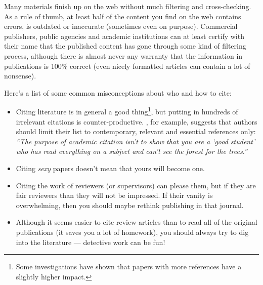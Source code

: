 \documentclass[graybox,envcountchap,sectrefs,UStrade]{svmono}
\begin{document}
Many materials finish up on the web without much filtering and cross-checking. As a rule of thumb, at least half of the content you find on the web contains errors, is outdated or inaccurate (sometimes even on purpose). Commercial publishers, public agencies and academic institutions can at least certify with their name that the published content has gone through some kind of filtering process, although there is almost never any warranty that the information in publications is 100\% correct (even nicely formatted articles can contain a lot of nonsense). \par

Here's a list of some common misconceptions about who and how to cite:

\begin{itemize}
  \item Citing literature is in general a good thing\footnote{Some investigations have shown that papers with more references have a slightly higher impact.}, but putting in hundreds of irrelevant citations is counter-productive. \citet{Smith1990TR}, for example, suggests that authors should limit their list to contemporary, relevant and essential references only: \emph{``The purpose of academic citation isn't to show that you are a `good student' who has read everything on a subject and can't see the forest for the trees.''}
  \item Citing \emph{sexy} papers doesn't mean that yours will become one.
  \item Citing the work of reviewers (or supervisors) can please them, but if they are fair reviewers than they will not be impressed. If their vanity is overwhelming, then you should maybe rethink publishing in that journal.
  \item Although it seems easier to cite review articles than to read all of the original publications (it saves you a lot of homework), you should always try to dig into the literature --- detective work can be fun!
\end{itemize}
\end{document}
